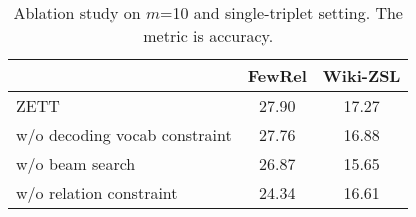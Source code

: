 \begin{table}[t]
    \centering
    \small
    \begin{tabular}{lcc}
    \toprule
         & FewRel & Wiki-ZSL \\\midrule
         ZETT & 27.90 & 17.27 \\
\quad w/o decoding vocab constraint & 27.76 & 16.88 \\
\quad w/o beam search & 26.87 & 15.65 \\
\quad w/o relation constraint & 24.34 & 16.61 \\ \bottomrule
    \end{tabular}
    \caption{Ablation study on $m$=10 and single-triplet setting. The metric is accuracy.}
    \label{tab:ablation}
\end{table}

